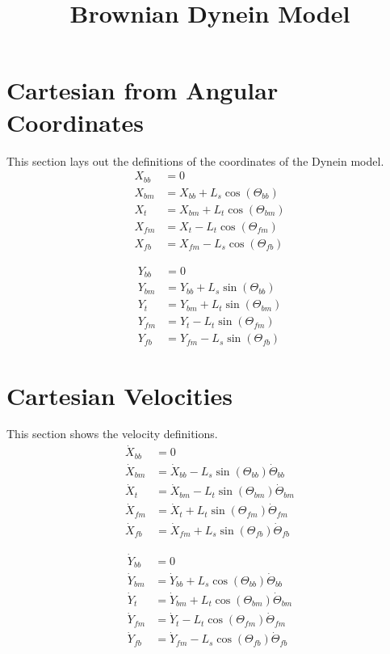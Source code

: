 \documentclass[11pt, landscape]{article}
\title{Brownian Dynein Model}
\begin{document}
\maketitle

\section{Cartesian from Angular Coordinates}
This section lays out the definitions of the coordinates of the Dynein model. \\
\begin{align}
  X_{bb} &= 0 \\
  X_{bm} &= X_{bb}+L_{s}\cos(\Theta_{bb}) \\
  X_{t}  &= X_{bm}+L_{t}\cos(\Theta_{bm}) \\
  X_{fm} &= X_{t} - L_{t}\cos(\Theta_{fm}) \\
  X_{fb} &= X_{fm} - L_{s}\cos(\Theta_{fb})
\end{align}

\begin{align}
  Y_{bb} &= 0 \\
  Y_{bm} &= Y_{bb}+L_{s}\sin(\Theta_{bb}) \\
  Y_{t}  &= Y_{bm}+L_{t}\sin(\Theta_{bm}) \\
  Y_{fm} &= Y_{t} - L_{t}\sin(\Theta_{fm}) \\
  Y_{fb} &= Y_{fm} - L_{s}\sin(\Theta_{fb})
\end{align}

\section{Cartesian Velocities}
This section shows the velocity definitions. \\
\begin{align}
  \dot{X}_{bb} &= 0 \\
  \dot{X}_{bm} &= \dot{X}_{bb} - L_{s}\sin(\Theta_{bb})\dot{\Theta}_{bb} \\
  \dot{X}_{t } &= \dot{X}_{bm} - L_{t}\sin(\Theta_{bm})\dot{\Theta}_{bm} \\
  \dot{X}_{fm} &= \dot{X}_{t } + L_{t}\sin(\Theta_{fm})\dot{\Theta}_{fm} \\
  \dot{X}_{fb} &= \dot{X}_{fm} + L_{s}\sin(\Theta_{fb})\dot{\Theta}_{fb}
\end{align}  
             
\begin{align}                                                                          
  \dot{Y}_{bb} &= 0 \\                                                        
  \dot{Y}_{bm} &= \dot{Y}_{bb} + L_{s}\cos(\Theta_{bb})\dot{\Theta}_{bb} \\
  \dot{Y}_{t}  &= \dot{Y}_{bm} + L_{t}\cos(\Theta_{bm})\dot{\Theta}_{bm} \\
  \dot{Y}_{fm} &= \dot{Y}_{t } - L_{t}\cos(\Theta_{fm})\dot{\Theta}_{fm} \\
  \dot{Y}_{fb} &= \dot{Y}_{fm} - L_{s}\cos(\Theta_{fb})\dot{\Theta}_{fb}
\end{align}
\end{document}
